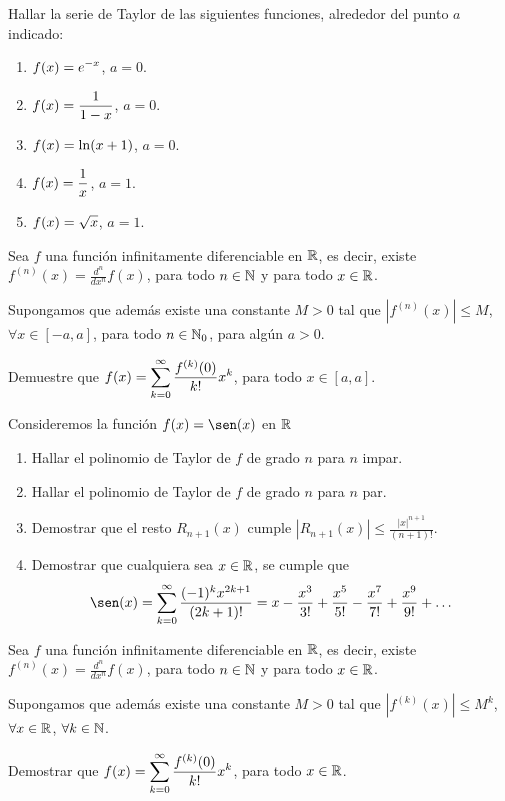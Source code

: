\item Hallar la serie de Taylor de las siguientes funciones, alrededor del punto $a$ indicado:
\begin{multicols}{2}
  \begin{enumerate}
    \item $\displaystyle f(x) = e^{-x}$, $a = 0$.
    \item $\displaystyle f(x) = \frac1{1-x}$, $a = 0$.
    \item $\displaystyle f(x) = \ln (x+1)$, $a = 0$.
    \item $\displaystyle f(x) = \frac1x$, $a = 1$.
    \item $\displaystyle f(x) = \sqrt{x}$, $a = 1$.
  \end{enumerate}
  
\end{multicols}

\item Sea $f$ una función infinitamente diferenciable en $\mathbb{R}$, es decir, existe $f^{(n)}(x) = \frac{d^n}{dx^n}f(x)$, para todo $n\in 
\mathbb{N}$ y para todo $x\in \mathbb{R}$. 

Supongamos que además existe una constante $M>0$ tal que $|f^{(n)}(x)| \le M$, $\forall x\in [-a,a]$, para todo $n\in\mathbb{N}_0$, para algún $a>0$.

Demuestre que 
$\displaystyle f(x) = \sum_{k=0}^\infty \frac{f^{(k)}(0)}{k!}x^k$, para todo $x\in [a,a]$.

\item Consideremos la función $f(x)=\sen(x)$ en $\mathbb{R}$

\begin{enumerate}
\item Hallar el polinomio de Taylor de $f$ de grado $n$ para $n$ impar.

\item Hallar el polinomio de Taylor de $f$ de grado $n$ para $n$ par.

\item Demostrar que el resto $R_{n+1}(x)$ cumple $|R_{n+1}(x)| \le \frac{|x|^{n+1}}{(n+1)!}$.

\item  Demostrar que cualquiera sea $x \in \mathbb{R}$, se cumple que
\[ 
\sen(x) = \sum_{k=0}^\infty \frac{(-1)^k x^{2k+1} }{(2k+1)!}  
= x - \frac{x^3}{3!} + \frac{x^5}{5!} - \frac{x^7}{7!} + \frac{x^9}{9!} + \dots
\]
\end{enumerate}

\item Sea $f$ una función infinitamente diferenciable en $\mathbb{R}$, es decir, existe $f^{(n)}(x) = \frac{d^n}{dx^n}f(x)$, para todo $n\in 
\mathbb{N}$ y para todo $x\in \mathbb{R}$. 

Supongamos que además existe una constante $M>0$ tal que $|f^{(k)}(x)| \le M^k$, $\forall x\in \mathbb{R}$, $\forall k \in \mathbb{N}$.

Demostrar que 
$\displaystyle f(x) = \sum_{k=0}^\infty \frac{f^{(k)}(0)}{k!}x^k$, para todo $x\in \mathbb{R}$.